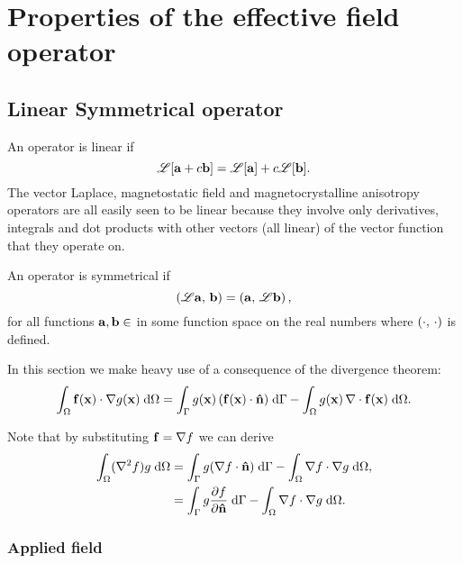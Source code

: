 \newtheorem{theorem}{Theorem}

\newcommand{\ff}{f}
\newcommand{\gf}{g}

\newcommand{\knl}{k}

\chapter{Properties of the effective field operator}
\label{sec:properties-of-field-operators}

\section{Linear Symmetrical operator}
\label{sec:linear-symm-field-operators}

An operator is linear if
\begin{equation}
  \mathscr{L}[{\mathbf{a}} + c{\mathbf{b}}] = \mathscr{L}[{\mathbf{a}}] + c\mathscr{L}[{\mathbf{b}}].
\end{equation}
The vector Laplace, magnetostatic field and magnetocrystalline anisotropy operators are all easily seen to be linear because they involve only derivatives, integrals and dot products with other vectors (all linear) of the vector function that they operate on.

An operator is symmetrical if
\begin{equation}
  \left(\mathscr{L} {\mathbf{a}},\, {\mathbf{b}} \right) = \left({\mathbf{a}},\, \mathscr{L} {\mathbf{b}} \right),
\end{equation}
for all functions ${\mathbf{a}}, {\mathbf{b}} \in $ in some function space on the real numbers where $\left(\cdot,\, \cdot \right)$ is defined.

In this section we make heavy use of a consequence of the divergence theorem:
\begin{equation}
  \intd{\fv(\xv) \cdot \grad \gf(\xv)}
  = \intb{\gf(\xv) \, (\fv(\xv) \cdot \nv)} - \intd{\gf(\xv) \, \div \fv(\xv)}.
  \label{eqn:grad-divergence}
\end{equation}

Note that by substituting $\fv = \grad \ff$ we can derive
\begin{equation}
  \begin{aligned}
    \intd{(\lap \ff) \gf}
    &= \intb{\gf (\nabla \ff \cdot \nv)} - \intd{\nabla \ff \cdot \nabla \gf}, \\
    &= \intb{\gf \ddn{\ff}} - \intd{\nabla \ff \cdot \nabla \gf}.
    \label{eqn:laplace-divergence}
  \end{aligned}
\end{equation}

\subsection{Applied field}


